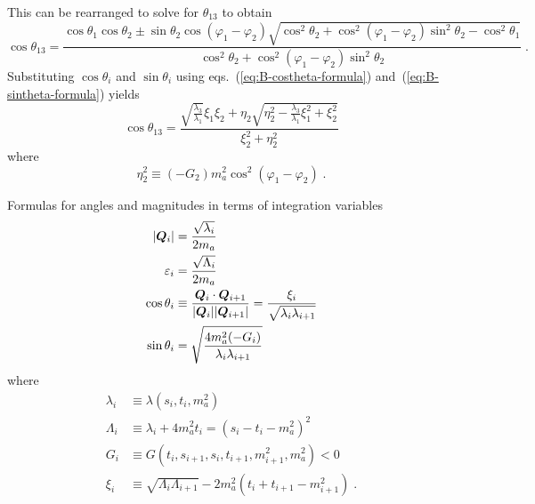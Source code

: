 This can be rearranged to solve for $\theta_{13}$ to obtain
\begin{equation}
    \cos \theta_{13} = \frac{\cos \theta_1 \cos \theta_2 \pm \sin \theta_2 \cos(\varphi_1 - \varphi_2) \sqrt{\cos^2 \theta_2 + \cos^2(\varphi_1 - \varphi_2) \sin^2 \theta_2 - \cos^2 \theta_1}}{\cos^2 \theta_2 + \cos^2(\varphi_1 - \varphi_2) \sin^2 \theta_2} \; .
\end{equation}
Substituting $\cos \theta_i$ and $\sin \theta_i$ using eqs.~(\ref{eq:B-costheta-formula}) and~(\ref{eq:B-sintheta-formula}) yields
\begin{equation}
    \cos \theta_{13} =
    \frac
        {   \sqrt{\frac{\lambda_3}{\lambda_1}} \xi_1 \xi_2
            +
            \eta_2
            \sqrt{\eta_2^2 - \frac{\lambda_3}{\lambda_1}\xi_1^2 + \xi_2^2}
        }
        {
            \xi_2^2 +\eta_2^2
        }
\end{equation}
where
\begin{equation}
    \eta_2^2 \equiv (-G_2) m_a^2 \cos^2(\varphi_1 - \varphi_2) \; .
\end{equation}
\reversemarginpar{}
\begin{bluenv}{Formulas for angles and magnitudes in terms of integration variables}
    \vspace{-2ex}
    \begin{align}
        |\bm{Q}_{i}| &= \frac{\sqrt{\lambda_i}}{2 m_a} \label{eq:B-Qmag-formula}\\
        \varepsilon_i &= \frac{\sqrt{\Lambda_i}}{2 m_a} \label{eq:B-epsilon-formula}\\
        \cos \theta_i &\equiv \frac{\bm{Q}_{i}\cdot\bm{Q}_{i+1}}{|\bm{Q}_{i}||\bm{Q}_{i+1}|} 
            =  \frac{\xi_i}{\sqrt{\lambda_i \lambda_{i+1}}} \label{eq:B-costheta-formula}\\
        \sin\theta_i &= \sqrt{\frac{4 m_a^2 (-G_{i})}{\lambda_{i} \lambda_{i+1}}} \label{eq:B-sintheta-formula}
    \end{align}
    where
    \begin{align}
        \label{eq:app-lambda-definitions}
        \lambda_i &\equiv \lambda(s_i, t_i, m_a^2) \\
        \Lambda_i &\equiv \lambda_i + 4 m_a^2 t_i = (s_i - t_i - m_a^2)^2 \\
        G_i &\equiv G(t_i, s_{i+1}, s_i, t_{i+1}, m_{i+1}^2, m_a^2) < 0 \\
        \xi_i &\equiv \sqrt{\Lambda_i \Lambda_{i+1}} - 2 m_a^2 (t_i + t_{i+1} - m_{i+1}^2) \; .
    \end{align}
\end{bluenv}


